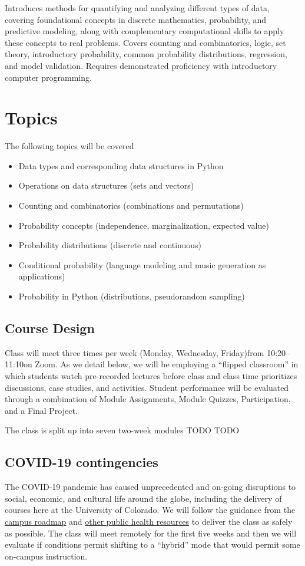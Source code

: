 \documentclass[10pt]{memoir}
\def\mymeetingdays{Monday, Wednesday, Friday}
\def\mymeetingtimes{10:20--11:10}
\begin{document}
Introduces methods for quantifying and analyzing different types of data, covering foundational
concepts in discrete mathematics, probability, and predictive modeling, along with complementary computational skills to apply these concepts to real problems. Covers counting and combinatorics, logic, set theory, introductory probability, common probability distributions, regression,
and model validation. Requires demonstrated proficiency with introductory computer programming.

\section{Topics}

The following topics will be covered

\begin{itemize}
\item Data types and corresponding data structures in Python
\item Operations on data structures (sets and vectors)
\item Counting and combinatorics (combinations and permutations)
\item Probability concepts (independence, marginalization, expected value)
\item Probability distributions (discrete and continuous)
\item Conditional probability (language modeling and music generation as applications)
\item Probability in Python (distributions, pseudorandom sampling)
\end{itemize}

\subsection{Course Design}
Class will meet three times per week (\mymeetingdays)\space from \mymeetingtimes\space on Zoom. As we detail below, we will be employing a ``flipped classroom'' in which students watch pre-recorded lectures before class and class time prioritizes discussions, case studies, and activities. Student performance will be evaluated through a combination of Module Assignments, Module Quizzes, Participation, and a Final Project. 

The class is split up into seven two-week modules TODO TODO

\subsection{COVID-19 contingencies}
The COVID-19 pandemic has caused unprecedented and on-going disruptions to social, economic, and cultural life around the globe, including the delivery of courses here at the University of Colorado. We will follow the guidance from the \href{https://www.colorado.edu/roadmap/}{campus roadmap} and \href{https://covid19.colorado.gov/}{other public health resources} to deliver the class as safely as possible. The class will meet remotely for the first five weeks and then we will evaluate if conditions permit shifting to a ``hybrid'' mode that would permit some on-campus instruction.
\end{document}
